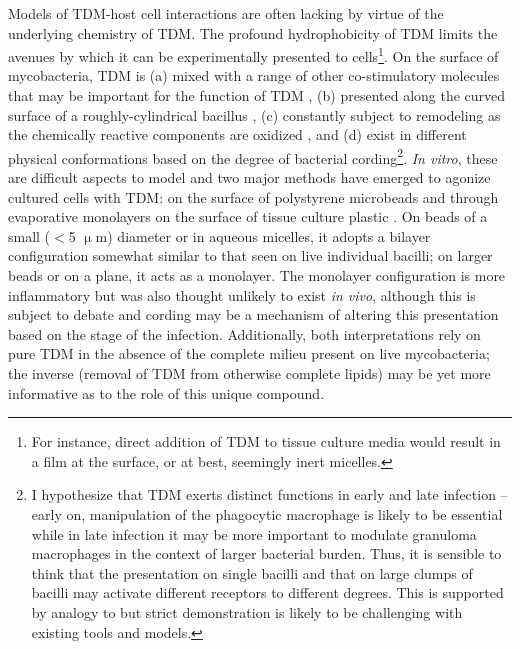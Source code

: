 Models of TDM\hyp{}host cell interactions are often lacking by virtue of the underlying chemistry of TDM. The profound hydrophobicity of TDM limits the avenues by which it can be experimentally presented to cells\footnote{For instance, direct addition of TDM to tissue culture media would result in a film at the surface, or at best, seemingly inert micelles.}. On the surface of mycobacteria, TDM is (a) mixed with a range of other co\hyp{}stimulatory molecules that may be important for the function of TDM \citep{Rhoades2003, Mazurek2012, Torrelles2010}, (b) presented along the curved surface of a roughly\hyp{}cylindrical bacillus \citep{McCarter1935, Krokowski2018}, (c) constantly subject to remodeling as the chemically reactive components are oxidized \citep{Hett2010, Meniche2014, Shaku2020, Chan1989}, and (d) exist in different physical conformations based on the degree of bacterial cording\footnote{I hypothesize that TDM exerts distinct functions in early and late infection -- early on, manipulation of the phagocytic macrophage is likely to be essential while in late infection it may be more important to modulate granuloma macrophages in the context of larger bacterial burden. Thus, it is sensible to think that the presentation on single bacilli and that on large clumps of bacilli may activate different receptors to different degrees. This is supported by analogy to \citet{Goodridge2011} but strict demonstration is likely to be challenging with existing tools and models.}. \textit{In vitro}, these are difficult aspects to model and two major methods have emerged to agonize cultured cells with TDM: on the surface of polystyrene microbeads \citep{Bloch1950, Bowdish2009, Indrigo2003, Retzinger1982, Behling1993, Geisel2005} and through evaporative monolayers on the surface of tissue culture plastic \citep{Schabbing1994, Harland2008, Hunter2006a, Ishikawa2009, Zhao2014, Miyake2013}. On beads of a small ($<$5 $\upmu$m) diameter or in aqueous micelles, it adopts a bilayer configuration somewhat similar to that seen on live individual bacilli; on larger beads or on a plane, it acts as a monolayer. The monolayer configuration is more inflammatory but was also thought unlikely to exist \textit{in vivo}, although this is subject to debate and cording may be a mechanism of altering this presentation based on the stage of the infection. Additionally, both interpretations rely on pure TDM in the absence of the complete milieu present on live mycobacteria; the inverse (removal of TDM from otherwise complete lipids) may be yet more informative as to the role of this unique compound.

